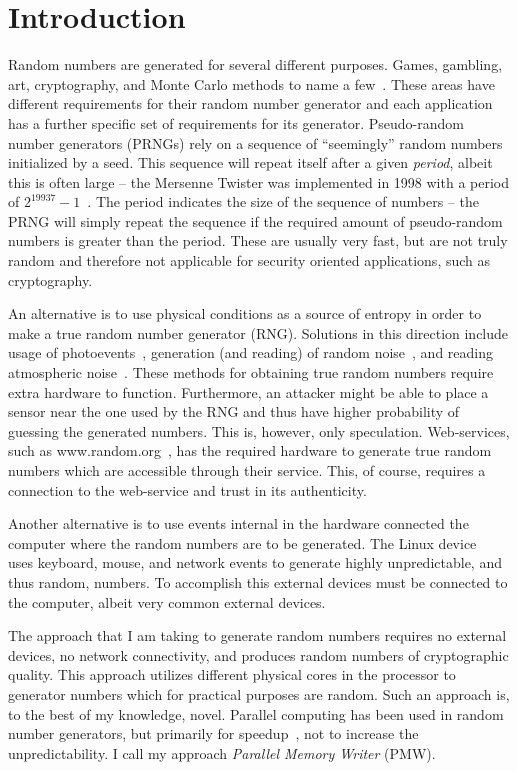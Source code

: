 \section{Introduction}
\label{sec:intro}
Random numbers are generated for several different purposes.
Games, gambling, art, cryptography, and Monte Carlo methods to name a few~\citep{Stojanovski01chaos-basedrandom}.
These areas have different requirements for their random number generator and each application has a further specific set of requirements for its generator.
Pseudo-random number generators (PRNGs) rely on a sequence of ``seemingly'' random numbers initialized by a seed.
This sequence will repeat itself after a given \emph{period}, albeit this is often large -- the Mersenne Twister was implemented in 1998 with a period of $2^{19937}-1$~\citep{Matsumoto98}.
The period indicates the size of the sequence of numbers -- the PRNG will simply repeat the sequence if the required amount of pseudo-random numbers is greater than the period.
These are usually very fast, but are not truly random and therefore not applicable for security oriented applications, such as cryptography.

An alternative is to use physical conditions as a source of entropy in order to make a true random number generator (RNG).
Solutions in this direction include usage of photoevents~\citep{Martino91}, generation (and reading) of random noise~\citep{Holman97}, and reading atmospheric noise~\citep{random.org}.
These methods for obtaining true random numbers require extra hardware to function.
Furthermore, an attacker might be able to place a sensor near the one used by the RNG and thus have higher probability of guessing the generated numbers.
This is, however, only speculation.
Web-services, such as www.random.org~\citep{random.org}, has the required hardware to generate true random numbers which are accessible through their service.
This, of course, requires a connection to the web-service and trust in its authenticity.

Another alternative is to use events internal in the hardware connected the computer where the random numbers are to be generated.
The Linux device \devrandom{}~\citep{devrandom} uses keyboard, mouse, and network events to generate highly unpredictable, and thus random, numbers.
To accomplish this external devices must be connected to the computer, albeit very common external devices.

The approach that I am taking to generate random numbers requires no external devices, no network connectivity, and produces random numbers of cryptographic quality.
This approach utilizes different physical cores in the processor to generator numbers which for practical purposes are random.
Such an approach is, to the best of my knowledge, novel.
Parallel computing has been used in random number generators, but primarily for speedup~\citep{parallelRand}, not to increase the unpredictability.
I call my approach \emph{Parallel Memory Writer} (PMW).

